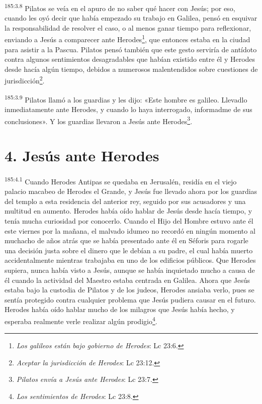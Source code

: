 \par
\textsuperscript{185:3.8} Pilatos se veía en el apuro de no saber qué hacer con Jesús; por eso, cuando les oyó decir que había empezado su trabajo en Galilea, pensó en esquivar la responsabilidad de resolver el caso, o al menos ganar tiempo para reflexionar, enviando a Jesús a comparecer ante Herodes\footnote{\textit{Los galileos están bajo gobierno de Herodes}: Lc 23:6.}, que entonces estaba en la ciudad para asistir a la Pascua. Pilatos pensó también que este gesto serviría de antídoto contra algunos sentimientos desagradables que habían existido entre él y Herodes desde hacía algún tiempo, debidos a numerosos malentendidos sobre cuestiones de jurisdicción\footnote{\textit{Aceptar la jurisdicción de Herodes}: Lc 23:12.}.

\par
\textsuperscript{185:3.9} Pilatos llamó a los guardias y les dijo: «Este hombre es galileo. Llevadlo inmediatamente ante Herodes, y cuando lo haya interrogado, informadme de sus conclusiones». Y los guardias llevaron a Jesús ante Herodes\footnote{\textit{Pilatos envía a Jesús ante Herodes}: Lc 23:7.}.

\section*{4. Jesús ante Herodes}
\par
\textsuperscript{185:4.1} Cuando Herodes Antipas se quedaba en Jerusalén, residía en el viejo palacio macabeo de Herodes el Grande, y Jesús fue llevado ahora por los guardias del templo a esta residencia del anterior rey, seguido por sus acusadores y una multitud en aumento. Herodes había oído hablar de Jesús desde hacía tiempo, y tenía mucha curiosidad por conocerlo. Cuando el Hijo del Hombre estuvo ante él este viernes por la mañana, el malvado idumeo no recordó en ningún momento al muchacho de años atrás que se había presentado ante él en Séforis para rogarle una decisión justa sobre el dinero que le debían a su padre, el cual había muerto accidentalmente mientras trabajaba en uno de los edificios públicos. Que Herodes supiera, nunca había visto a Jesús, aunque se había inquietado mucho a causa de él cuando la actividad del Maestro estaba centrada en Galilea. Ahora que Jesús estaba bajo la custodia de Pilatos y de los judeos, Herodes ansiaba verlo, pues se sentía protegido contra cualquier problema que Jesús pudiera causar en el futuro. Herodes había oído hablar mucho de los milagros que Jesús había hecho, y esperaba realmente verle realizar algún prodigio\footnote{\textit{Los sentimientos de Herodes}: Lc 23:8.}.


